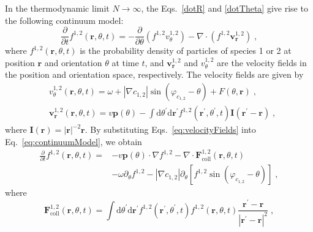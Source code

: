 \documentclass{article}
\begin{document}
In the thermodynamic limit $N\rightarrow \infty$, the Eqs.~\eqref{dotR} and \eqref{dotTheta} give rise to the following continuum model:
\begin{equation}
    \frac{\partial}{\partial t}f ^{1,2}\left( \mathbf{r},\theta ,t \right) =-\frac{\partial}{\partial \theta}\left( f ^{1,2}v_{\theta}^{1,2} \right) -\nabla \cdot \left( f ^{1,2}\mathbf{v}_{\mathbf{r}}^{1,2} \right) \;, \label{eq:continuumModel}
\end{equation}
where $f^{1,2}\left( \mathbf{r},\theta ,t \right)$ is the probability density of particles of species 1 or 2 at position $\mathbf{r}$ and orientation $\theta$ at time $t$, and $\mathbf{v}_{\mathbf{r}}^{1,2}$ and $v_{\theta}^{1,2}$ are the velocity fields in the position and orientation space, respectively. The velocity fields are given by
\begin{subequations}
    \begin{align}
        &v_{\theta}^{1,2}\left( \mathbf{r},\theta ,t \right) =\omega +\left| \nabla c_{1,2} \right|\sin \left( \varphi _{c_{1,2}} -\theta \right) +F\left( \theta ,\mathbf{r} \right)  \;,\\
        &\mathbf{v}_{\mathbf{r}}^{1,2}\left( \mathbf{r},\theta ,t \right) =v\mathbf{p}\left( \theta \right) -\int{\mathrm{d}\theta ^{\prime} \mathrm{d}\mathbf{r}^{\prime} f ^{1,2}\left( \mathbf{r}^{\prime} ,\theta ^{\prime} ,t \right) \mathbf{I}\left( \mathbf{r}^{\prime}-\mathbf{r} \right)} \;,
    \end{align}
    \label{eq:velocityFields}
\end{subequations}
where $\mathbf{I}\left( \mathbf{r} \right)=|\mathbf{r}|^{-2}\mathbf{r}$. By substituting Eqs.~\eqref{eq:velocityFields} into Eq.~\eqref{eq:continuumModel}, we obtain
\begin{equation}
    \begin{aligned}
        \frac{\partial}{\partial t}f ^{1,2}\left( \mathbf{r},\theta ,t \right) =&-v\mathbf{p}\left( \theta \right) \cdot \nabla f ^{1,2}-\nabla \cdot \mathbf{F}^{1,2}_{\text{coll}}\left( \mathbf{r},\theta ,t \right) \\
        &-\omega \partial _{\theta}f ^{1,2}-\left| \nabla c_{1,2} \right|\partial _{\theta}\left[ f ^{1,2}\sin \left( \varphi _{c_{1,2}}-\theta \right) \right]\;,
    \end{aligned}
\end{equation}
where
\begin{equation}
    \mathbf{F}^{1,2}_{\text{coll}}\left( \mathbf{r},\theta ,t \right)=\int{\mathrm{d}\theta ^{\prime}\mathrm{d}\mathbf{r}^{\prime}f^{1,2}\left( \mathbf{r}^{\prime},\theta ^{\prime},t \right) f^{1,2}\left( \mathbf{r},\theta ,t \right) \frac{\mathbf{r}^{\prime}-\mathbf{r}}{\left| \mathbf{r}^{\prime}-\mathbf{r} \right|^2}}\;,
\end{equation}
\end{document}
